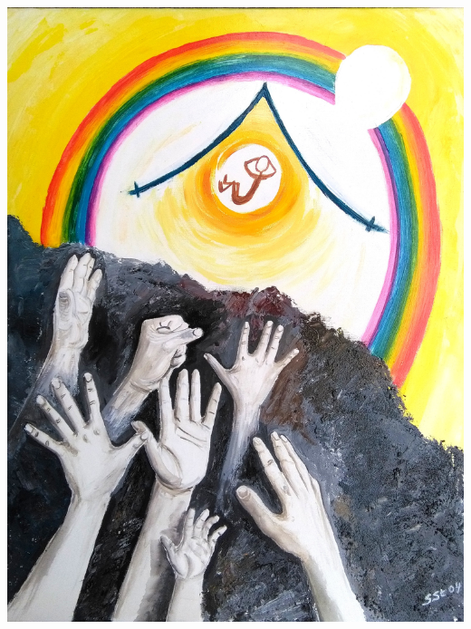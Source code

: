 \documentclass[a4paper,twoside, svgnames]{article}
\begin{document}
\begin{multicols}{2}
\begin{onehalfspacing}
\begin{justify}
\textit{}

\begin{center}
\includegraphics[width=\linewidth]{images/susanne/b2_derherristmeinlicht}
\end{center}

\vfill


\end{justify}
\end{onehalfspacing}
\end{multicols}
\end{document}
